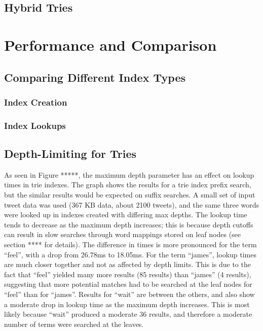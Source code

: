 \documentclass{vldb}
\begin{document}
\subsection{Hybrid Tries}

\section{Performance and Comparison}

\subsection{Comparing Different Index Types}

\subsubsection{Index Creation}

\subsubsection{Index Lookups}

\subsection{Depth-Limiting for Tries}
As seen in Figure *****, the maximum depth parameter has an effect on lookup times in trie indexes. The graph shows the results for a trie index prefix search, but the similar results would be expected on suffix searches. A small set of input tweet data was used (367 KB data, about 2100 tweets), and the same three words were looked up in indexes created with differing max depths. The lookup time tends to decrease as the maximum depth increases; this is because depth cutoffs can result in slow searches through word mappings stored on leaf nodes (see section **** for details). The difference in times is more pronounced for the term ``feel'', with a drop from 26.78ms to 18.05ms. For the term ``james'', lookup times are much closer together and not as affected by depth limits. This is due to the fact that ``feel'' yielded many more results (85 results) than ``james'' (4 results), suggesting that more potential matches had to be searched at the leaf nodes for ``feel'' than for ``james''. Results for ``wait'' are between the others, and also show a moderate drop in lookup time as the maximum depth increases. This is most likely because ``wait'' produced a moderate 36 results, and therefore a moderate number of terms were searched at the leaves.
\end{document}
